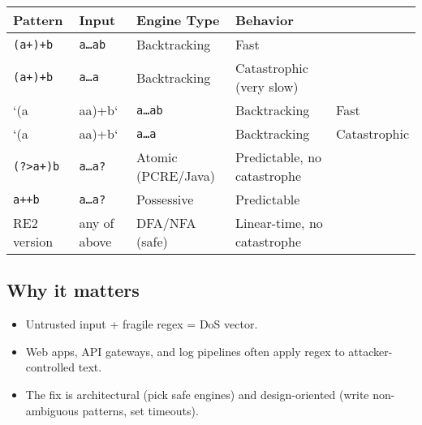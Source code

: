 \documentclass[
  letterpaper,
  DIV=11,
  numbers=noendperiod]{scrreprt}
\providecommand{\tightlist}{%
  \setlength{\itemsep}{0pt}\setlength{\parskip}{0pt}}
\begin{document}
\begin{longtable}[]{@{}
  >{\raggedright\arraybackslash}p{}
  >{\raggedright\arraybackslash}p{}
  >{\raggedright\arraybackslash}p{}
  >{\raggedright\arraybackslash}p{}
  >{\raggedright\arraybackslash}p{}@{}}
\toprule\noalign{}
\begin{minipage}[b]{\linewidth}\raggedright
Pattern
\end{minipage} & \begin{minipage}[b]{\linewidth}\raggedright
Input
\end{minipage} & \begin{minipage}[b]{\linewidth}\raggedright
Engine Type
\end{minipage} & \begin{minipage}[b]{\linewidth}\raggedright
Behavior
\end{minipage} & \begin{minipage}[b]{\linewidth}\raggedright
\end{minipage} \\
\midrule\noalign{}
\endhead
\bottomrule\noalign{}
\endlastfoot
\texttt{(a+)+b} & \texttt{a…ab} & Backtracking & Fast & \\
\texttt{(a+)+b} & \texttt{a…a} & Backtracking & Catastrophic (very slow)
& \\
`(a & aa)+b` & \texttt{a…ab} & Backtracking & Fast \\
`(a & aa)+b` & \texttt{a…a} & Backtracking & Catastrophic \\
\texttt{(?\textgreater{}a+)b} & \texttt{a…a?} & Atomic (PCRE/Java) &
Predictable, no catastrophe & \\
\texttt{a++b} & \texttt{a…a?} & Possessive & Predictable & \\
RE2 version & any of above & DFA/NFA (safe) & Linear-time, no
catastrophe & \\
\end{longtable}

\subsection{Why it matters}\label{why-it-matters-55}

\begin{itemize}
\tightlist
\item
  Untrusted input + fragile regex = DoS vector.
\item
  Web apps, API gateways, and log pipelines often apply regex to
  attacker-controlled text.
\item
  The fix is architectural (pick safe engines) and design-oriented
  (write non-ambiguous patterns, set timeouts).
\end{itemize}
\end{document}
